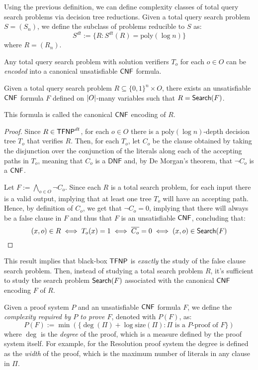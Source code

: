 Using the previous definition, we can define complexity classes of total query search problems via decision tree reductions. Given a total query search problem $S = (S_n)$, we define the subclass of problems reducible to $S$ as:
\[S^{dt} := \{R : S^{dt}(R) = \mathrm{poly}(\log n)\}\]
where $R = (R_n)$.

Any total query search problem  with solution verifiers $T_o$ for each $o \in O$ can be \textit{encoded} into a canonical unsatisfiable $\mathsf{CNF}$ formula. 

\begin{proposition}
    Given a total query search problem $R \subseteq \{0,1\}^n \times O$, there exists an unsatisfiable $\mathsf{CNF}$ formula $F$ defined on $\left|O\right|$-many variables such that $R = \mathsf{Search}(F)$.
    
    This formula is called the canonical $\mathsf{CNF}$ encoding of $R$.
\end{proposition}

\begin{proof}
    Since $R \in \mathsf{TFNP}^{dt}$, for each $o \in O$ there is a $\mathrm{poly}(\log n)$-depth decision tree $T_o$ that verifies $R$. Then, for each $T_o$, let $C_o$ be the clause obtained by taking the disjunction over the conjunction of the literals along each of the accepting paths in $T_o$, meaning that $C_o$ is a $\mathsf{DNF}$ and, by De Morgan's theorem, that $\lnot{C_o}$ is a $\mathsf{CNF}$.

    Let $F := \bigwedge\limits_{o \in O} \lnot{C_o}$. Since each $R$ is a total search problem, for each input there is a valid output, implying that at least one tree $T_o$ will have an accepting path. Hence, by definition of $C_o$, we get that $\lnot{C_o} = 0$, implying that there will always be a false clause in $F$ and thus that $F$ is an unsatisfiable $\mathsf{CNF}$, concluding that:
    \[(x,o) \in R \iff T_o(x) = 1 \iff \overline{C_o} = 0 \iff (x,o) \in \mathsf{Search}(F)\]
\end{proof}

This result implies that black-box $\mathsf{TFNP}$ is \textit{exactly} the study of the false clause search problem. Then, instead of studying a total search problem $R$, it's sufficient to study the search problem $\mathsf{Search}(F)$ associated with the canonical $\mathsf{CNF}$ encoding $F$ of $R$.

Given a proof system $P$ and an unsatisfiable $\mathsf{CNF}$ formula $F$, we define the \textit{complexity required by $P$ to prove $F$}, denoted with $P(F)$, as:
\[P(F) := \min(\{\deg(\Pi) + \log \mathrm{size}(\Pi) : \Pi \text{ is a $P$-proof of $F$}\})\]
where $\deg$ is the \textit{degree} of the proof, which is a measure defined by the proof system itself. For example, for the Resolution proof system the degree is defined as the \textit{width} of the proof, which is the maximum number of literals in any clause in $\Pi$.

